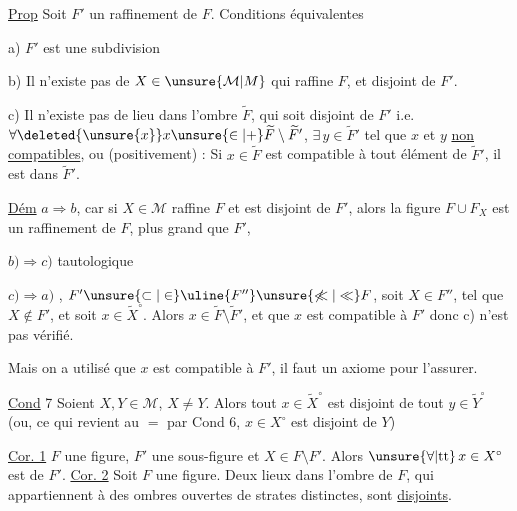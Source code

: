\uline{Prop} Soit $F'$ un raffinement de $F$. Conditions équivalentes

a) $F'$ est une subdivision

b) Il n'existe pas de $X\in\unsure{\mathcal M|M}$ qui raffine $F$, et disjoint de $F'$.

c)  Il n'existe pas de lieu dans l'ombre $\widetilde F$, qui soit disjoint de $F'$ i.e.  $\forall\deleted{\unsure{x}}x\unsure{\in|+}\widetilde F\setminus\widetilde F'$, $\exists\,y\in\widetilde F'$ tel que $x$ et $y$ \uline{non compatibles}, ou (positivement) : Si $x\in\widetilde F$ est compatible à tout élément de $\widetilde F'$, il est dans $\widetilde F'$.

\uline{Dém} $a\Longrightarrow b$, car si $X\in\mathcal M$ raffine $F$ et est disjoint de $F'$, alors la figure $F\cup F_X$ est un raffinement de $F$,  plus grand que $F'$,

$b)\Longrightarrow c)$ tautologique

$c)\Longrightarrow a)$  , $F'\unsure{\subset|\in} \uline{F''}\unsure{\not\ll|\ll}F$, soit $X\in F''$, tel que $X\notin F'$, et soit $x\in\widetilde X^\circ$. Alors $x\in\widetilde F\setminus\widetilde F'$, et  que $x$ est compatible à $F'$ donc c) n'est pas vérifié.

Mais on a utilisé que $x$ est compatible à $F'$, il faut un axiome pour l'assurer.

\uline{Cond} 7 Soient $X,Y\in\mathcal M$,  $X\ne Y$.  Alors tout $x\in\widetilde X^\circ$ est disjoint de tout $y\in\widetilde Y^\circ$ (ou, ce qui revient au $=$ par Cond 6,  $x\in X^\circ$ est disjoint de $Y$)

\uline{Cor. 1}  $F$ une figure, $F'$ une sous-figure et $X\in F\setminus F'$. Alors $\unsure{\forall|\mathrm{tt}}\,x\in X^\circ$ est   de $F'$.
\uline{Cor. 2} Soit $F$ une figure. Deux lieux dans  l'ombre de $F$, qui appartiennent à des ombres ouvertes de strates distinctes, sont \uline{disjoints}.

